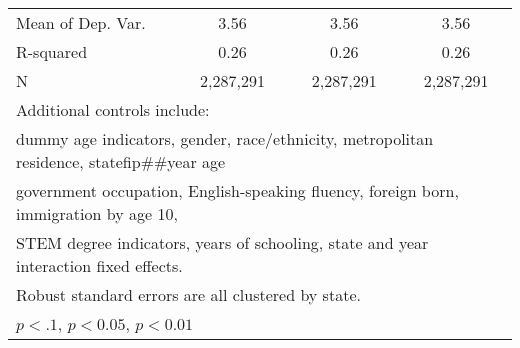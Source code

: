 \begin{table}[htbp]
\begin{tabular}{l*{3}{c}}
\midrule
Mean of Dep. Var.   &        3.56         &        3.56         &        3.56         \\
R-squared           &        0.26         &        0.26         &        0.26         \\
N                   &   2,287,291         &   2,287,291         &   2,287,291         \\
\bottomrule
\multicolumn{4}{l}{\footnotesize Additional controls include:}\\
\multicolumn{4}{l}{\footnotesize dummy age indicators, gender, race/ethnicity, metropolitan residence, statefip##year age}\\
\multicolumn{4}{l}{\footnotesize government occupation, English-speaking fluency, foreign born, immigration by age 10,}\\
\multicolumn{4}{l}{\footnotesize STEM degree indicators, years of schooling, state and year interaction fixed effects.}\\
\multicolumn{4}{l}{\footnotesize Robust standard errors are all clustered by state.}\\
\multicolumn{4}{l}{\footnotesize \sym{*} \(p<.1\), \sym{**} \(p<0.05\), \sym{***} \(p<0.01\)}\\
\end{tabular}
\end{table}
